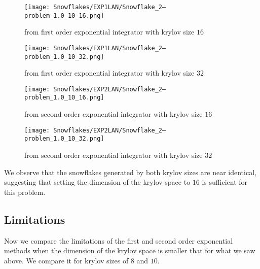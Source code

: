 \begin{figure}[H]
    \centering
    \begin{minipage}{0.49\textwidth}
        \texttt{[image: Snowflakes/EXP1LAN/Snowflake\_2--problem\_1.0\_10\_16.png]} %
        \caption{from first order exponential integrator with krylov size $16$}
        \label{fig:first order 16}
    \end{minipage}\hfill
    \centering
    \begin{minipage}{0.49\textwidth}
        \texttt{[image: Snowflakes/EXP1LAN/Snowflake\_2--problem\_1.0\_10\_32.png]} %
        \caption{from first order exponential integrator with krylov size $32$}
        \label{fig:first order 32}
    \end{minipage}\hfill
\end{figure}\begin{figure}[H]
    \centering
    \begin{minipage}{0.49\textwidth}
        \texttt{[image: Snowflakes/EXP2LAN/Snowflake\_2--problem\_1.0\_10\_16.png]} %
        \caption{from second order exponential integrator with krylov size $16$}
        \label{fig:second order 16}
    \end{minipage}\hfill
    \centering
    \begin{minipage}{0.49\textwidth}
        \texttt{[image: Snowflakes/EXP2LAN/Snowflake\_2--problem\_1.0\_10\_32.png]} %
        \caption{from second order exponential integrator with krylov size $32$}
        \label{fig:second order 32}
    \end{minipage}\hfill
\end{figure}

We observe that the snowflakes generated by both krylov sizes are near identical, 
suggesting that setting the dimension of the krylov space to $16$ is sufficient for this problem.\\

\subsection{Limitations}
Now we compare the limitations of the first and second order exponential methods when the dimension of the krylov space is smaller that for what we saw above.
We compare it for krylov sizes of $8$ and $10$.


